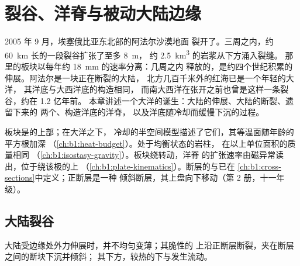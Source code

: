 \chapter{裂谷、洋脊与被动大陆边缘}\label{ch:b1:rifts-ridges-margins}

2005 年 9 月，埃塞俄比亚东北部的阿法尔沙漠地面
裂开了。三周之内，约 \qty{60}{km} 长的一段裂谷扩张了至多 \qty{8}{m}，
约 \qty{2.5}{km^3} 的岩浆从下方涌入裂缝。
那里的板块以每年约 \qty{18}{mm} 的速率分离：几周之内
释放的，是约四个世纪积累的伸展。阿法尔是一块正在断裂的大陆，
北方几百千米外的红海已是一个年轻的大洋，
其洋底与大西洋底的构造相同，
而南大西洋在张开之前也曾是这样一条裂谷，约在 1.2 亿年前。
本章讲述一个大洋的诞生：大陆的伸展、大陆的断裂、遗留下来的
两个、构造洋底的洋脊，
以及洋底随冷却而缓慢下沉的过程。

\begin{recall}
板块是的上部；在大洋之下，
冷却的半空间模型描述了它们，其等温面随年龄的平方根加深
（\cref{ch:b1:heat-budget}）。处于均衡状态的岩柱，
在以上单位面积的质量相同
（\cref{ch:b1:isostasy-gravity}）。板块绕转动，洋脊
的扩张速率由磁异常读出，位于绕该极的上
（\cref{ch:b1:plate-kinematics}）。断层的与已在
\cref{ch:b1:cross-sections}中定义；正断层是一种
倾斜断层，其上盘向下移动（第 2 册，十一年级）。
\end{recall}

\section{大陆裂谷}

大陆受边缘处外力伸展时，并不均匀变薄；其脆性的
上沿正断层断裂，夹在断层之间的断块下沉并倾斜；
其下方，较热的下与发生流动。

